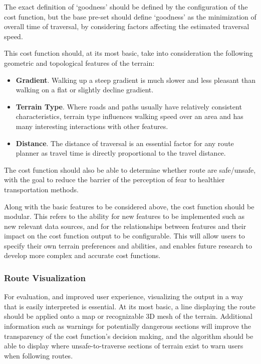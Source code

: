 \documentclass[12pt]{article}
\begin{document}
The exact definition of `goodness' should be defined by the configuration of the cost function, but the base pre-set should define `goodness' as the minimization of overall time of traversal, by considering factors affecting the estimated traversal speed.

This cost function should, at its most basic, take into consideration the following geometric and topological features of the terrain:

\begin{itemize}
  \item \textbf{Gradient}. Walking up a steep gradient is much slower and less pleasant than walking on a flat or slightly decline gradient.
  \item \textbf{Terrain Type}. Where roads and paths usually have relatively consistent characteristics, terrain type influences walking speed over an area and has many interesting interactions with other features.
  \item \textbf{Distance}. The distance of traversal is an essential factor for any route planner as travel time is directly proportional to the travel distance.
\end{itemize}

The cost function should also be able to determine whether route are safe/unsafe, with the goal to reduce the barrier of the perception of fear to healthier transportation methods.

Along with the basic features to be considered above, the cost function should be modular. This refers to the ability for new features to be implemented such as new relevant data sources, and for the relationships between features and their impact on the cost function output to be configurable. This will allow users to specify their own terrain preferences and abilities, and enables future research to develop more complex and accurate cost functions.

\subsubsection{Route Visualization}

For evaluation, and improved user experience, visualizing the output in a way that is easily interpreted is essential. At its most basic, a line displaying the route should be applied onto a map or recognizable 3D mesh of the terrain. Additional information such as warnings for potentially dangerous sections will improve the transparency of the cost function's decision making, and the algorithm should be able to display where unsafe-to-traverse sections of terrain exist to warn users when following routes.
\end{document}
